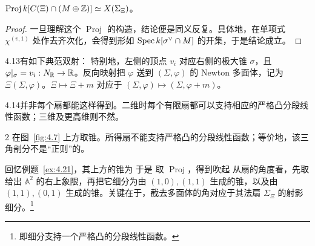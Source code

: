 \begin{proposition}\label{prop:4.13}
$\operatorname{Proj}k[C(\Xi)\cap(M\oplus\mathbb Z)]\simeq X(\Sigma_\Xi)$。
\end{proposition}
\begin{proof}
一旦理解这个 $\operatorname{Proj}$ 的构造，结论便是同义反复。具体地，在单项式 $\chi^{(v,1)}$ 处作去齐次化，会得到形如 $\operatorname{Spec} k[\sigma^\vee\cap M]$ 的开集，于是结论成立。
\end{proof}
\begin{Note}{4.13}有如下典范双射：
特别地，左侧的顶点 $v_i$ 对应右侧的极大锥 $\sigma$，且 $\varphi|_\sigma=v_i:N_{\mathbb R}\to\mathbb R$。反向映射把 $\varphi$ 送到 $(\Sigma,\varphi)$ 的 Newton 多面体，记为 $\Xi(\Sigma,\varphi)$。$\Xi\mapsto\Xi+m$ 对应于 $(\Sigma,\varphi)\mapsto(\Sigma,\varphi+m)$。
\end{Note}
\begin{Note}{4.14}并非每个扇都能这样得到。二维时每个有限扇都可以支持相应的严格凸分段线性函数；三维及更高维则不然。\end{Note}
\begin{Counterexample}{2}\label{counterex:2}
在图~\ref{fig:4.7} 上方取锥。所得扇不能支持严格凸的分段线性函数；等价地，该三角剖分不是“正则”的。
\end{Counterexample}
\begin{example}\label{ex:4.27}
回忆例题~\ref{ex:4.21}，其上方的锥为
于是
取 $\operatorname{Proj}$，得到吹起
从扇的角度看，先取给出 $\mathbb A^2$ 的右上象限，再把它细分为由 $(1,0),(1,1)$ 生成的锥，以及由 $(1,1),(0,1)$ 生成的锥。关键在于，截去多面体的角对应于其法扇 $\Sigma_\Xi$ 的射影细分。\footnote{即细分支持一个严格凸的分段线性函数。}
\end{example}
